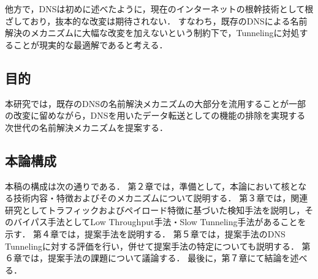 他方で，DNSは初めに述べたように，現在のインターネットの根幹技術として根ざしており，抜本的な改変は期待されない．
すなわち，既存のDNSによる名前解決のメカニズムに大幅な改変を加えないという制約下で，Tunnelingに対処することが現実的な最適解であると考える．


\subsection{目的}
本研究では，既存のDNSの名前解決メカニズムの大部分を流用することが一部の改変に留めながら，DNSを用いたデータ転送としての機能の排除を実現する次世代の名前解決メカニズムを提案する．




\subsection{本論構成}
本稿の構成は次の通りである．
第２章では，準備として，本論において核となる技術内容・特徴およびそのメカニズムについて説明する．
第３章では，関連研究としてトラフィックおよびペイロード特徴に基づいた検知手法を説明し，そのバイパス手法としてLow Throughput手法・Slow Tunneling手法があることを示す．
第４章では，提案手法を説明する．
第５章では，提案手法のDNS Tunnelingに対する評価を行い，併せて提案手法の特定についても説明する．
第６章では，提案手法の課題について議論する．
最後に，第７章にて結論を述べる．
